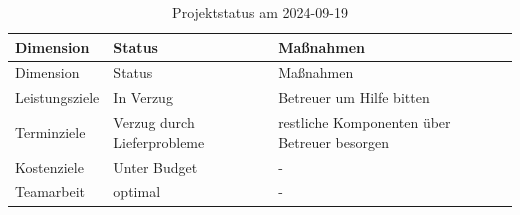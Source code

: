 \documentclass[
    headings=optiontotocandhead,%
    twoside,
    numbers=noenddot,%
    12pt, %
    titlepage, %
    parskip=full, %
    listof=leveldown, 
    numbers=noenddot, %
    a4paper,DIV=14,
    BCOR=15mm,
]{scrbook}
\begin{document}
\begin{longtable}[]{@{}lll@{}}
\caption{Projektstatus am 2024-09-19}\tabularnewline
\toprule
\begin{minipage}[b]{0.30\columnwidth}\raggedright
Dimension\strut
\end{minipage} & \begin{minipage}[b]{0.27\columnwidth}\raggedright
Status\strut
\end{minipage} & \begin{minipage}[b]{0.34\columnwidth}\raggedright
Maßnahmen\strut
\end{minipage}\tabularnewline
\midrule
\endfirsthead
\toprule
\begin{minipage}[b]{0.30\columnwidth}\raggedright
Dimension\strut
\end{minipage} & \begin{minipage}[b]{0.27\columnwidth}\raggedright
Status\strut
\end{minipage} & \begin{minipage}[b]{0.34\columnwidth}\raggedright
Maßnahmen\strut
\end{minipage}\tabularnewline
\midrule
\endhead
\begin{minipage}[t]{0.30\columnwidth}\raggedright
Leistungsziele\strut
\end{minipage} & \begin{minipage}[t]{0.27\columnwidth}\raggedright
In Verzug\strut
\end{minipage} & \begin{minipage}[t]{0.34\columnwidth}\raggedright
Betreuer um Hilfe bitten\strut
\end{minipage}\tabularnewline
\begin{minipage}[t]{0.30\columnwidth}\raggedright
Terminziele\strut
\end{minipage} & \begin{minipage}[t]{0.27\columnwidth}\raggedright
Verzug durch Lieferprobleme\strut
\end{minipage} & \begin{minipage}[t]{0.34\columnwidth}\raggedright
restliche Komponenten über Betreuer besorgen\strut
\end{minipage}\tabularnewline
\begin{minipage}[t]{0.30\columnwidth}\raggedright
Kostenziele\strut
\end{minipage} & \begin{minipage}[t]{0.27\columnwidth}\raggedright
Unter Budget\strut
\end{minipage} & \begin{minipage}[t]{0.34\columnwidth}\raggedright
-\strut
\end{minipage}\tabularnewline
\begin{minipage}[t]{0.30\columnwidth}\raggedright
Teamarbeit\strut
\end{minipage} & \begin{minipage}[t]{0.27\columnwidth}\raggedright
optimal\strut
\end{minipage} & \begin{minipage}[t]{0.34\columnwidth}\raggedright
-\strut
\end{minipage}\tabularnewline
\bottomrule
\end{longtable}
\end{document}
